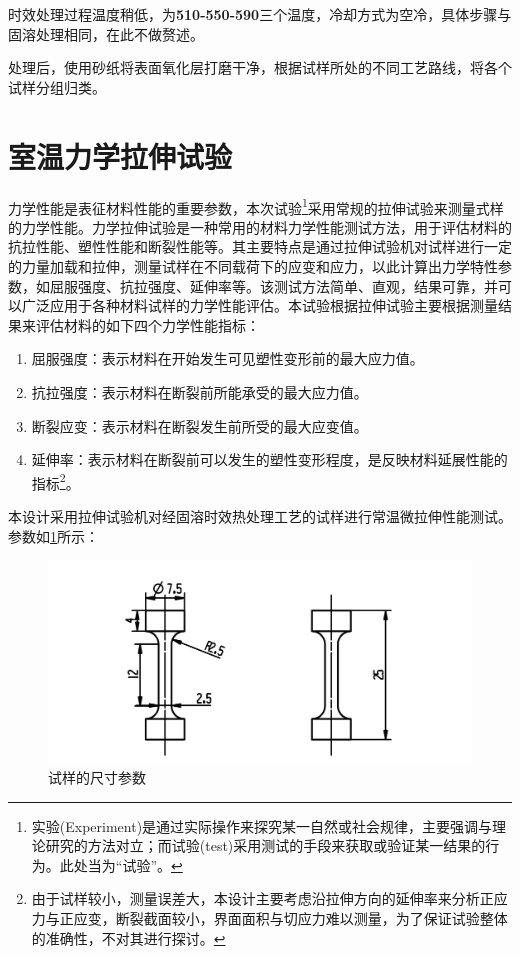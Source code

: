 时效处理过程温度稍低，为\textbf{510-550-590}三个温度，冷却方式为空冷，具体步骤与固溶处理相同，在此不做赘述。

处理后，使用砂纸将表面氧化层打磨干净，根据试样所处的不同工艺路线，将各个试样分组归类。


\section{室温力学拉伸试验}
力学性能是表征材料性能的重要参数，本次试验\footnote{实验(Experiment)是通过实际操作来探究某一自然或社会规律，主要强调与理论研究的方法对立；而试验(test)采用测试的手段来获取或验证某一结果的行为。此处当为“试验”。}采用常规的拉伸试验来测量式样的力学性能。力学拉伸试验是一种常用的材料力学性能测试方法，用于评估材料的抗拉性能、塑性性能和断裂性能等。其主要特点是通过拉伸试验机对试样进行一定的力量加载和拉伸，测量试样在不同载荷下的应变和应力，以此计算出力学特性参数，如屈服强度、抗拉强度、延伸率等。该测试方法简单、直观，结果可靠，并可以广泛应用于各种材料试样的力学性能评估。本试验根据拉伸试验主要根据测量结果来评估材料的如下四个力学性能指标：
\begin{enumerate}
	\item 屈服强度：表示材料在开始发生可见塑性变形前的最大应力值。
	\item 抗拉强度：表示材料在断裂前所能承受的最大应力值。
	\item 断裂应变：表示材料在断裂发生前所受的最大应变值。
	\item 延伸率：表示材料在断裂前可以发生的塑性变形程度，是反映材料延展性能的指标\footnote{由于试样较小，测量误差大，本设计主要考虑沿拉伸方向的延伸率来分析正应力与正应变，断裂截面较小，界面面积与切应力难以测量，为了保证试验整体的准确性，不对其进行探讨。}。
\end{enumerate}

本设计采用拉伸试验机对经固溶时效热处理工艺的试样进行常温微拉伸性能测试。参数如\ref{fig:试样尺寸}所示：

\begin{figure}[h!]
	\centering
	\includegraphics[width=0.7\linewidth]{pic/试样}
	\caption{试样的尺寸参数}
	\label{fig:试样尺寸}
\end{figure}


